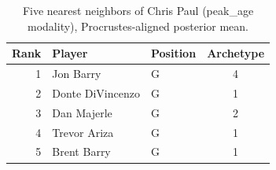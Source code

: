 \begin{table}[htbp]
  \centering\small
  \begin{tabular}{rllc}
    \toprule
    Rank & Player & Position & Archetype \\
    \midrule
    1 & Jon Barry & G & 4 \\
    2 & Donte DiVincenzo & G & 1 \\
    3 & Dan Majerle & G & 2 \\
    4 & Trevor Ariza & G & 1 \\
    5 & Brent Barry & G & 1 \\
    \bottomrule
  \end{tabular}
  \caption{Five nearest neighbors of Chris Paul (peak_age modality), Procrustes-aligned posterior mean.}
  \label{tab:Chris_Paul_neighbors_peak_age}
\end{table}


